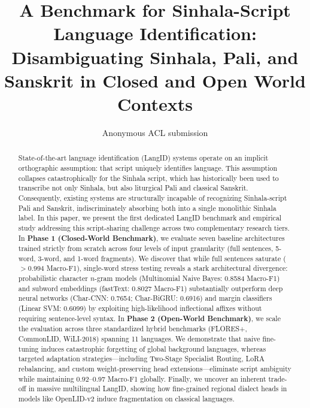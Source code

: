 \documentclass[11pt]{article}
\title{A Benchmark for Sinhala-Script Language Identification: \\ Disambiguating Sinhala, Pali, and Sanskrit in Closed and Open World Contexts}
\author{Anonymous ACL submission}
\begin{document}
\maketitle

\begin{abstract}
State-of-the-art language identification (LangID) systems operate on an implicit orthographic assumption: that script uniquely identifies language. This assumption collapses catastrophically for the Sinhala script, which has historically been used to transcribe not only Sinhala, but also liturgical Pali and classical Sanskrit. Consequently, existing systems are structurally incapable of recognizing Sinhala-script Pali and Sanskrit, indiscriminately absorbing both into a single monolithic Sinhala label. In this paper, we present the first dedicated LangID benchmark and empirical study addressing this script-sharing challenge across two complementary research tiers. In \textbf{Phase 1 (Closed-World Benchmark)}, we evaluate seven baseline architectures trained strictly from scratch across four levels of input granularity (full sentences, 5-word, 3-word, and 1-word fragments). We discover that while full sentences saturate ($>0.994$ Macro-F1), single-word stress testing reveals a stark architectural divergence: probabilistic character $n$-gram models (Multinomial Naive Bayes: 0.8584 Macro-F1) and subword embeddings (fastText: 0.8027 Macro-F1) substantially outperform deep neural networks (Char-CNN: 0.7654; Char-BiGRU: 0.6916) and margin classifiers (Linear SVM: 0.6099) by exploiting high-likelihood inflectional affixes without requiring sentence-level syntax. In \textbf{Phase 2 (Open-World Benchmark)}, we scale the evaluation across three standardized hybrid benchmarks (FLORES+, CommonLID, WiLI-2018) spanning 11 languages. We demonstrate that naive fine-tuning induces catastrophic forgetting of global background languages, whereas targeted adaptation strategies—including Two-Stage Specialist Routing, LoRA rebalancing, and custom weight-preserving head extensions—eliminate script ambiguity while maintaining $0.92$--$0.97$ Macro-F1 globally. Finally, we uncover an inherent trade-off in massive multilingual LangID, showing how fine-grained regional dialect heads in models like OpenLID-v2 induce fragmentation on classical languages.
\end{abstract}
\end{document}
